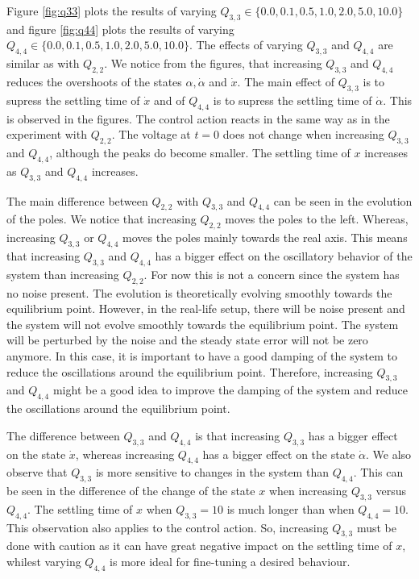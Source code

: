 \documentclass[a4paper,10pt]{article}
\theoremstyle{bluehomework}
\numberwithin{equation}{section}
\begin{document}
Figure \ref{fig:q33} plots the results of varying $Q_{3,3} \in \{0.0, 0.1, 0.5, 1.0, 2.0, 5.0, 10.0\}$ and figure \ref{fig:q44} plots the results of varying $Q_{4,4} \in \{0.0, 0.1, 0.5, 1.0, 2.0, 5.0, 10.0\}$. The effects of varying $Q_{3,3}$ and $Q_{4,4}$ are similar as with $Q_{2,2}$. We notice from the figures, that increasing $Q_{3,3}$ and $Q_{4,4}$ reduces the overshoots of the states $\alpha, \dot{\alpha}$ and $\dot{x}$. The main effect of $Q_{3,3}$ is to supress the settling time of $\dot{x}$ and of $Q_{4,4}$ is to supress the settling time of $\dot{\alpha}$. This is observed in the figures. The control action reacts in the same way as in the experiment with $Q_{2,2}$. The voltage at $t = 0$ does not change when increasing $Q_{3,3}$ and $Q_{4,4}$, although the peaks do become smaller. The settling time of $x$ increases as $Q_{3,3}$ and $Q_{4,4}$ increases.
\medskip

The main difference between $Q_{2,2}$ with $Q_{3,3}$ and $Q_{4,4}$ can be seen in the evolution of the poles. We notice that increasing $Q_{2,2}$ moves the poles to the left. Whereas, increasing $Q_{3,3}$ or $Q_{4,4}$ moves the poles mainly towards the real axis. This means that increasing $Q_{3,3}$ and $Q_{4,4}$ has a bigger effect on the oscillatory behavior of the system than increasing $Q_{2,2}$. For now this is not a concern since the system has no noise present. The evolution is theoretically evolving smoothly towards the equilibrium point. However, in the real-life setup, there will be noise present and the system will not evolve smoothly towards the equilibrium point. The system will be perturbed by the noise and the steady state error will not be zero anymore. In this case, it is important to have a good damping of the system to reduce the oscillations around the equilibrium point. Therefore, increasing $Q_{3,3}$ and $Q_{4,4}$ might be a good idea to improve the damping of the system and reduce the oscillations around the equilibrium point. 
\medskip

The difference between $Q_{3,3}$ and $Q_{4,4}$ is that increasing $Q_{3,3}$ has a bigger effect on the state $\dot{x}$, whereas increasing $Q_{4,4}$ has a bigger effect on the state $\dot{\alpha}$. We also observe that $Q_{3,3}$ is more sensitive to changes in the system than $Q_{4,4}$. This can be seen in the difference of the change of the state $x$ when increasing $Q_{3,3}$ versus $Q_{4,4}$. The settling time of $x$ when $Q_{3,3} = 10$ is much longer than when $Q_{4,4} = 10$. This observation also applies to the control action. So, increasing $Q_{3,3}$ must be done with caution as it can have great negative impact on the settling time of $x$, whilest varying $Q_{4,4}$ is more ideal for fine-tuning a desired behaviour.
\end{document}
